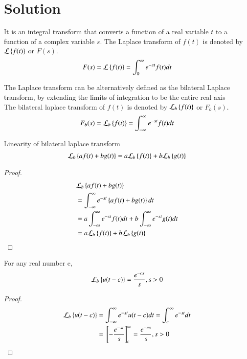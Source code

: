 \documentclass[journal,12pt,twocolumn]{IEEEtran}
\begin{document}
\section{Solution}
\begin{definition}
It is an integral transform that converts a function of a real variable $t$ to a function of a complex variable $s$. The Laplace transform of $f(t)$ is denoted by $\mathcal{L}\left\{f(t)\right\}$ or $F(s)$.
\begin{align}
    F(s)=\mathcal{L}\left\{f(t)\right\}=\int_{0}^{\infty}e^{-st}f(t)dt
\end{align}
\end{definition}
\begin{definition}
The Laplace transform can be alternatively defined as the bilateral Laplace transform, by extending the limits of integration to be the entire real axis\\
The bilateral laplace transform of $f(t)$ is denoted by $\mathcal{L}_b\left\{f(t)\right\}$ or $F_b(s)$.
\begin{align}
    F_b(s)=\mathcal{L}_b\left\{f(t)\right\}=\int_{-\infty}^{\infty}e^{-st}f(t)dt
\end{align}
\end{definition}
\begin{lemma}
Linearity of bilateral laplace transform
\begin{align} 
    \mathcal{L}_b\left\{af(t)+bg(t)\right\} = a\mathcal{L}_b\left\{f(t)\right\}+b\mathcal{L}_b\left\{g(t)\right\}\label{eq:linearity}
\end{align}
\begin{proof}
 \begin{align}
     &\mathcal{L}_b\left\{af(t)+bg(t)\right\} \\&= \int_{-\infty}^{\infty}e^{-st}\left\{af(t)+bg(t)\right\}dt\\
     &= a\int_{-\infty}^{\infty}e^{-st}f(t)dt+b\int_{-\infty}^{\infty}e^{-st}g(t)dt\\
     &= a\mathcal{L}_b\left\{f(t)\right\}+b\mathcal{L}_b\left\{g(t)\right\}
 \end{align}
\end{proof}
\end{lemma}
\begin{lemma}
For any real number c, 
\begin{align}
    \mathcal{L}_b\left\{u(t-c)\right\}=\dfrac{e^{-cs}}{s}, s>0
    \label{eq:u}
\end{align}
\end{lemma}
\begin{proof}
 \begin{align}
     \mathcal{L}_b\left\{u(t-c)\right\}&=\int_{-\infty}^{\infty}e^{-st}u(t-c)dt=\int_{c}^{\infty}e^{-st}dt\\
     &={}\left[-\dfrac{e^{-st}}{s}\right]_{c}^{\infty}=\dfrac{e^{-cs}}{s}, s>0
 \end{align}
\end{proof}
\end{document}
